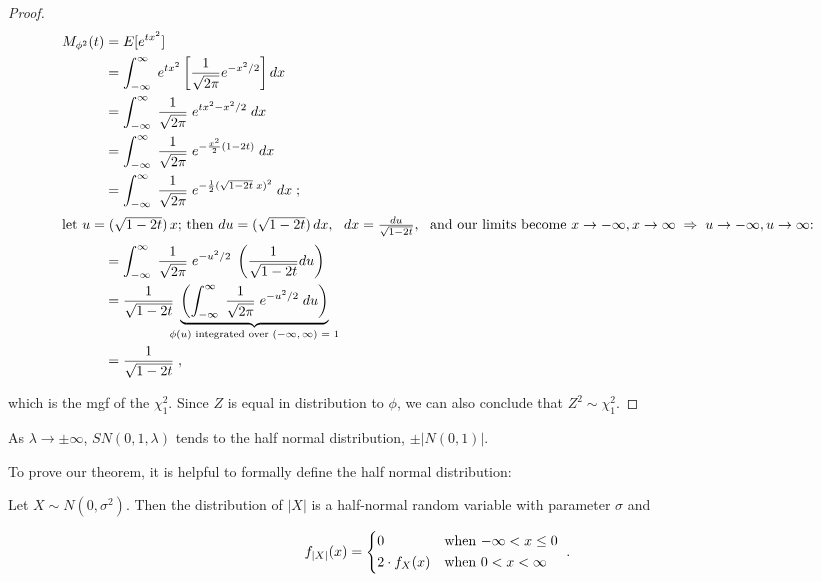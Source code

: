 \documentclass{article}
\begin{document}
\begin{proof}
  \begin{align*}
    M_{\phi^2}(t) &= E[e^{tx^2}] \\
    &= \int_{-\infty}^\infty \; e^{tx^2} \left[ \frac{1}{\sqrt{2\pi}} e^{-x^2/2} \right] dx \\
    &= \int_{-\infty}^\infty \; \frac{1}{\sqrt{2\pi}} \; e^{tx^2 - x^2/2} \; dx \\
    &= \int_{-\infty}^\infty \; \frac{1}{\sqrt{2\pi}} \; e^{-\frac{x^2}{2}(1 - 2t)} \; dx \\
    &= \int_{-\infty}^\infty \; \frac{1}{\sqrt{2\pi}} \; e^{-\frac{1}{2}(\sqrt{1-2t} \; x)^2} \; dx \;; \\
    \intertext{let $u = (\sqrt{1-2t}) \, x$; then $du = (\sqrt{1-2t}) \, dx$, \enspace $dx = \frac{du}{\sqrt{1-2t}}$, \enspace and our limits become $x \to -\infty, x \to \infty \Ra
      u \to -\infty, u \to \infty$:}
    &= \int_{-\infty}^\infty \; \frac{1}{\sqrt{2\pi}} \; e^{-u^2/2} \; \left( \frac{1}{\sqrt{1-2t}} du \right) \\
    &= \frac{1}{\sqrt{1-2t}} \; \underbrace{\left( \int_{-\infty}^\infty \; \frac{1}{\sqrt{2\pi}} \; e^{-u^2/2} \; du \right)}_{\mathclap{\textnormal{$\phi(u)$ integrated over
      $(-\infty,\infty)$ = 1}}} \label{phi-pdf} \\
    &= \frac{1}{\sqrt{1-2t}} \;,
  \end{align*}

  which is the mgf of the $\chi^2_1$. Since $Z$ is equal in distribution to
  $\phi$, we can also conclude that $Z^2 \sim \chi^2_1$. \end{proof}

\begin{property} \label{prop:3}
  As $\lambda \to \pm \infty$, \thinspace $SN(0,1,\lambda)$ tends to the half normal distribution, $\pm |N(0,1)|$.
\end{property}

To prove our theorem, it is helpful to formally define the half normal distribution:

\begin{helper-lem} \label{lem:p2-half-normal}
  Let $X \sim N(0, \sigma^2)$. Then the distribution of $|X|$ is a half-normal
  random variable with parameter $\sigma$ and

  \begin{equation*}
    f_{|X|}(x) =
    \begin{dcases*}
      0              & when $-\infty < x \leq 0$ \\
      2 \cdot f_X(x) & when $0 < x < \infty$ 
    \end{dcases*}
    .
  \end{equation*}
\end{helper-lem}
\end{document}
